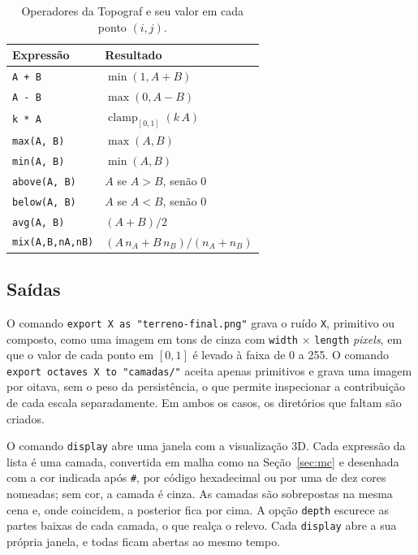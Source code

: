 \documentclass[sigconf, nonacm, screen, language=portuguese, language={main=english}]{acmart}
\begin{document}
\begin{table}[htb]
  \caption{Operadores da Topograf e seu valor em cada ponto $(i,j)$.}
  \label{tab:operadores}
  \centering
  \small
  \begin{tabular}{ll}
    \toprule
    \textbf{Expressão} & \textbf{Resultado} \\
    \midrule
    \texttt{A + B}              & $\min(1, A + B)$ \\
    \texttt{A - B}              & $\max(0, A - B)$ \\
    \texttt{k * A}              & $\operatorname{clamp}_{[0,1]}(k\,A)$ \\
    \texttt{max(A, B)}          & $\max(A, B)$ \\
    \texttt{min(A, B)}          & $\min(A, B)$ \\
    \texttt{above(A, B)}        & $A$ se $A > B$, senão $0$ \\
    \texttt{below(A, B)}        & $A$ se $A < B$, senão $0$ \\
    \texttt{avg(A, B)}          & $(A + B)/2$ \\
    \texttt{mix(A,B,nA,nB)}     & $(A\,n_A + B\,n_B)/(n_A + n_B)$ \\
    \bottomrule
  \end{tabular}
\end{table}

\subsection{Saídas}\label{sec:saidas}
O comando \texttt{export X as "terreno-final.png"} grava o ruído \texttt{X},
primitivo ou composto, como uma imagem em tons de cinza com
\texttt{width} $\times$ \texttt{length} \textit{pixels}, em que o valor
de cada ponto em $[0,1]$ é levado à faixa de 0 a 255. O comando
\texttt{export octaves X to "camadas/"} aceita apenas primitivos e grava
uma imagem por oitava, sem o peso da persistência, o que permite
inspecionar a contribuição de cada escala separadamente. Em ambos os
casos, os diretórios que faltam são criados.

O comando \texttt{display} abre uma janela com a visualização 3D. Cada
expressão da lista é uma camada, convertida em malha como na
Seção~\ref{sec:mc} e desenhada com a cor indicada após \texttt{\#}, por
código hexadecimal ou por uma de dez cores nomeadas; sem cor, a camada
é cinza. As camadas são sobrepostas na mesma cena e, onde coincidem, a
posterior fica por cima. A opção \texttt{depth} escurece as
partes baixas de cada camada, o que realça o relevo. Cada
\texttt{display} abre a sua própria janela, e todas ficam abertas ao
mesmo tempo.
\end{document}
